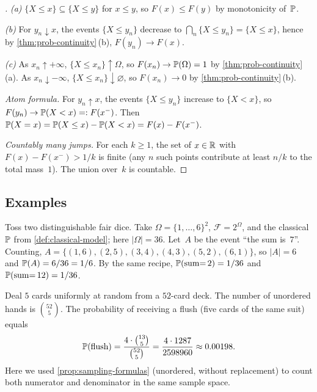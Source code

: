 \begin{proof}[]
\emph{(a)} $\{X \leq x\} \subseteq \{X \leq y\}$ for $x \leq y$, so
$F(x) \leq F(y)$ by monotonicity of~$\mathbb{P}$.

\emph{(b)} For $y_n \downarrow x$, the events $\{X \leq y_n\}$
decrease to $\bigcap_n \{X \leq y_n\} = \{X \leq x\}$, hence by
\cref{thm:prob-continuity}\,(b), $F(y_n) \to F(x)$.

\emph{(c)} As $x_n \uparrow +\infty$, $\{X \leq x_n\} \uparrow \Omega$,
so $F(x_n) \to \mathbb{P}(\Omega) = 1$ by \cref{thm:prob-continuity}\,(a).
As $x_n \downarrow -\infty$, $\{X \leq x_n\} \downarrow \varnothing$,
so $F(x_n) \to 0$ by \cref{thm:prob-continuity}\,(b).

\emph{Atom formula.} For $y_n \uparrow x$, the events $\{X \leq y_n\}$
increase to $\{X < x\}$, so $F(y_n) \to \mathbb{P}(X < x) =: F(x^{-})$. Then
$\mathbb{P}(X = x) = \mathbb{P}(X \leq x) - \mathbb{P}(X < x) = F(x) - F(x^{-})$.

\emph{Countably many jumps.} For each $k \geq 1$, the set of
$x \in \mathbb{R}$ with $F(x) - F(x^{-}) > 1/k$ is finite (any $n$ such
points contribute at least $n/k$ to the total mass~$1$). The union
over~$k$ is countable.
\end{proof}

\subsection*{Examples}

\begin{example}
\label{ex:two-dice}
Toss two distinguishable fair dice. Take
$\Omega = \{1, \dots, 6\}^2$, $\mathcal{F} = 2^{\Omega}$, and the
classical $\mathbb{P}$ from \cref{def:classical-model}; here
$|\Omega| = 36$. Let~$A$ be the event ``the sum is~$7$''. Counting,
$A = \{(1,6), (2,5), (3,4), (4,3), (5,2), (6,1)\}$, so $|A| = 6$ and
$\mathbb{P}(A) = 6/36 = 1/6$. By the same recipe, $\mathbb{P}(\text{sum}{=}\,2) = 1/36$
and $\mathbb{P}(\text{sum}{=}\,12) = 1/36$.
\end{example}

\begin{example}
\label{ex:cards}
Deal $5$ cards uniformly at random from a $52$-card deck. The number
of unordered hands is $\binom{52}{5}$. The probability of receiving a
flush (five cards of the same suit) equals
\[
  \mathbb{P}(\text{flush}) = \frac{4 \cdot \binom{13}{5}}{\binom{52}{5}} = \frac{4 \cdot 1287}{2598960} \approx 0.00198.
\]
Here we used \cref{prop:sampling-formulas} (unordered, without
replacement) to count both numerator and denominator in the same
sample space.
\end{example}

